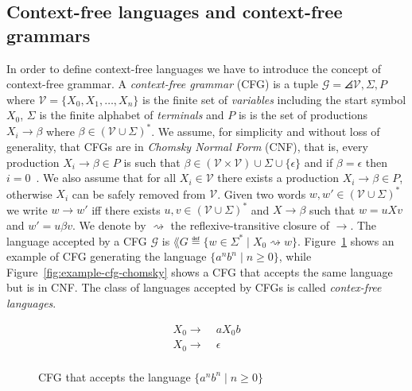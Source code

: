 \subsection{Context-free languages and context-free grammars}

In order to define context-free languages we have to introduce the concept of
context-free grammar.
A \emph{context-free grammar} (CFG) is a tuple $\mathcal{G} =\angles{\mathcal{V}, \Sigma, P}$
where $\mathcal{V} = \{X_0, X_1, \dots, X_n\}$ is the finite set of \emph{variables}
including the start symbol $X_0$,
$\Sigma$ is the finite alphabet of \emph{terminals} and
$P$ is is the set of productions $X_i \rightarrow \beta$ where
$\beta \in (\mathcal{V} \cup \Sigma)^*$.
We assume, for simplicity and without loss of generality,
that CFGs are in \emph{Chomsky Normal Form} (CNF),
that is, every production $X_i \rightarrow \beta \in P$ is such that
$\beta \in (\mathcal{V} \times \mathcal{V}) \cup \Sigma \cup \{\epsilon\}$
and if $\beta = \epsilon$ then $i = 0$~\cite{chomsky1959certain}.
We also assume that for all $X_i \in \mathcal{V}$ there exists a production
$X_i \rightarrow \beta \in P$, otherwise $X_i$ can be safely removed from $\mathcal{V}$.
Given two words $w,w' \in (\mathcal{V} \cup \Sigma)^*$ we write $w \rightarrow w'$
iff there exists $u,v \in (\mathcal{V} \cup \Sigma)^*$ and $X \rightarrow \beta$
such that $w = uXv$ and $w' = u\beta v$.
We denote by $\rightsquigarrow$ the reflexive-transitive closure of $\rightarrow$.
The language accepted by a CFG $\mathcal{G}$ is
$\lang{G} \eqdef \{w \in \Sigma^* \;|\; X_0 \rightsquigarrow w\}$.
Figure~\ref{fig:example-cfg} shows an example of CFG generating the language
$\{a^nb^n \;|\; n \geq 0\}$, while Figure~\ref{fig:example-cfg-chomsky} shows
a CFG that accepts the same language but is in CNF.
The class of languages accepted by CFGs is called \emph{contex-free languages}.

\begin{figure}[h]
\centering
\begin{equation*}
\begin{split}
X_0 \rightarrow \; & aX_0b \\
X_0 \rightarrow \; & \epsilon \\
\end{split}
\end{equation*}
\caption{CFG that accepts the language $\{a^nb^n \;|\; n \geq 0\}$}
\label{fig:example-cfg}
\end{figure}

